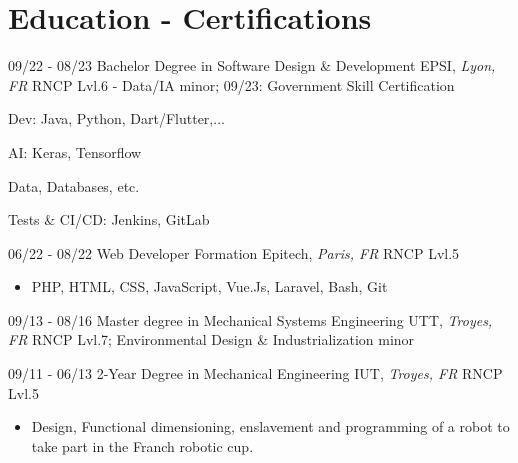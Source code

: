 \documentclass[]{friggeri-cv}
\begin{document}
\section{Education - Certifications}
\vspace*{-0.25cm}
\vspace{0.5mm}
\begin{entrylist}
  \entry
    {09/22 - 08/23}
    {Bachelor Degree in Software Design \& Development}
    {EPSI, \textit{Lyon, FR}}
    {RNCP Lvl.6 - Data/IA minor; \hspace{7mm} 09/23: Government Skill Certification}
\end{entrylist}
\vspace*{-0.65cm}
\begin{itemize}
\setlength{\itemsep}{1pt}
\setlength{\parskip}{0pt}
\setlength{\parsep}{0pt}
\begin{multicols}{2}
\item Dev: Java, Python, Dart/Flutter,...
\item AI: Keras, Tensorflow
\columnbreak
\item Data, Databases, etc.
\item Tests \& CI/CD: Jenkins, GitLab
\end{multicols}
\end{itemize}\vspace{0.5mm}
\begin{entrylist}
  \entry
    {06/22 - 08/22}
    {Web Developer Formation}
    {Epitech, \textit{Paris, FR}}
    {RNCP Lvl.5}
\end{entrylist}

\vspace*{-0.35cm}
\begin{itemize}
\setlength{\itemsep}{1pt}
\setlength{\parskip}{0pt}
\setlength{\parsep}{0pt}

\item PHP, HTML, CSS, JavaScript, Vue.Js, Laravel, Bash, Git
\end{itemize}\vspace{0.5mm}
\begin{entrylist}
  \entry
    {09/13 - 08/16}
    {Master degree in Mechanical Systems Engineering}
    {UTT, \textit{Troyes, FR}}
    {RNCP Lvl.7; Environmental Design \& Industrialization minor}
\end{entrylist}
\vspace{0.5mm}
\begin{entrylist}
  \entry
    {09/11 - 06/13}
    {2-Year Degree in Mechanical Engineering}
    {IUT, \textit{Troyes, FR}}
    {RNCP Lvl.5}
\end{entrylist}
\vspace*{-0.4cm}
\begin{itemize}
\setlength{\itemsep}{1pt}
\setlength{\parskip}{0pt}
\setlength{\parsep}{0pt}
\item Design, Functional dimensioning, enslavement and programming of a robot to take part in the Franch robotic cup.
\end{itemize}
\end{document}
